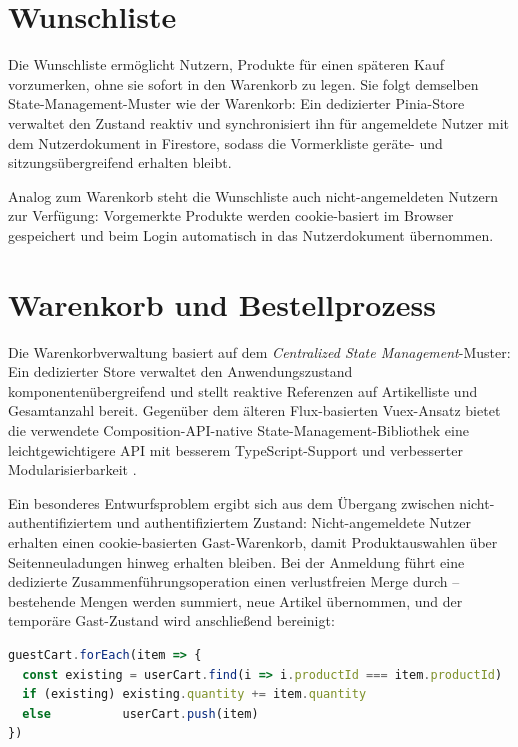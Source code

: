 \section{Wunschliste}
\label{sec:wunschliste}

Die Wunschliste ermöglicht Nutzern, Produkte für einen späteren Kauf vorzumerken, ohne sie sofort in den Warenkorb zu legen. Sie folgt demselben State-Management-Muster wie der Warenkorb: Ein dedizierter Pinia-Store verwaltet den Zustand reaktiv und synchronisiert ihn für angemeldete Nutzer mit dem Nutzerdokument in Firestore, sodass die Vormerkliste geräte- und sitzungsübergreifend erhalten bleibt.

Analog zum Warenkorb steht die Wunschliste auch nicht-angemeldeten Nutzern zur Verfügung: Vorgemerkte Produkte werden cookie-basiert im Browser gespeichert und beim Login automatisch in das Nutzerdokument übernommen.

\section{Warenkorb und Bestellprozess}
\label{sec:warenkorb}

Die Warenkorbverwaltung basiert auf dem \textit{Centralized State Management}-Muster: Ein dedizierter Store verwaltet den Anwendungszustand komponentenübergreifend und stellt reaktive Referenzen auf Artikelliste und Gesamtanzahl bereit. Gegenüber dem älteren Flux-basierten Vuex-Ansatz bietet die verwendete Composition-API-native State-Management-Bibliothek eine leichtgewichtigere API mit besserem TypeScript-Support und verbesserter Modularisierbarkeit \cite{pinia2025}.

Ein besonderes Entwurfsproblem ergibt sich aus dem Übergang zwischen nicht-authentifiziertem und authentifiziertem Zustand: Nicht-angemeldete Nutzer erhalten einen cookie-basierten Gast-Warenkorb, damit Produktauswahlen über Seitenneuladungen hinweg erhalten bleiben. Bei der Anmeldung führt eine dedizierte Zusammenführungsoperation einen verlustfreien Merge durch -- bestehende Mengen werden summiert, neue Artikel übernommen, und der temporäre Gast-Zustand wird anschließend bereinigt:

\begin{lstlisting}[language=JavaScript, caption=Kern der Warenkorb-Zusammenführung beim Login]
guestCart.forEach(item => {
  const existing = userCart.find(i => i.productId === item.productId)
  if (existing) existing.quantity += item.quantity
  else          userCart.push(item)
})
\end{lstlisting}

